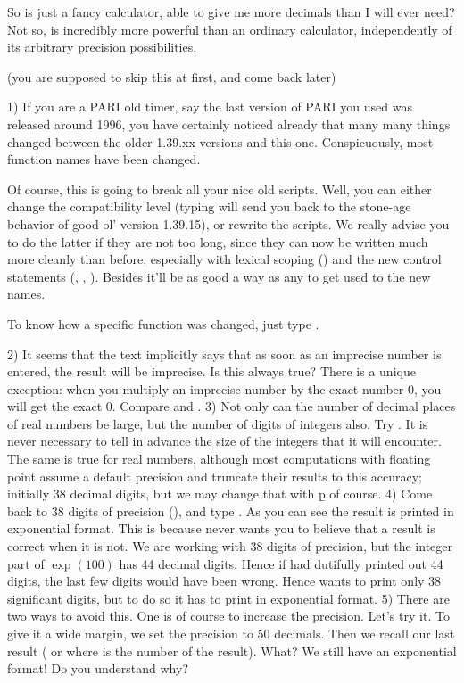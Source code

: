 So  is just a fancy calculator, able to give me more decimals than I
will ever need? Not so,  is incredibly more powerful than an ordinary
calculator, independently of its arbitrary precision possibilities.

 (you are supposed to skip this at first,
and come back later)

1) If you are a PARI old timer, say the last version of PARI you used was
released around 1996, you have certainly noticed already that many many
things changed between the older 1.39.xx versions and this one.
Conspicuously, most function names have been changed.

Of course, this is going to break all your nice old scripts. Well, you can
either change the compatibility level (typing 
will send you back to the stone-age behavior of good ol' version 1.39.15),
or rewrite the scripts. We really advise you to do the latter if they are not
too long, since they can now be written much more cleanly than before,
especially with lexical scoping () and the new control statements
(, , ). Besides it'll be as good a way as any
to get used to the new names.

To know how a specific function was changed, just type .

2) It seems that the text implicitly says that as soon as an imprecise number
is entered, the result will be imprecise. Is this always true? There is a
unique exception: when you multiply an imprecise number by the exact number
0, you will get the exact 0. Compare  and .
\smallskip
%
3) Not only can the number of decimal places of real numbers be large, but
the number of digits of integers also. Try . It is never necessary
to tell  in advance the size of the integers that it will encounter.
The same is true for real numbers, although most computations with floating
point assume a default precision and truncate their results to this accuracy;
initially 38 decimal digits, but we may change that with \b{p} of course.
\smallskip
%
4) Come back to 38 digits of precision (), and type
. As you can see the result is printed in exponential format.
This is because  never wants you to believe that a result is correct
when it is not. We are working with 38 digits of precision, but the integer
part of $\exp(100)$ has 44 decimal digits. Hence if  had dutifully
printed out 44 digits, the last few digits would have been wrong. Hence
 wants to print only 38 significant digits, but to do so it has to
print in exponential format. \smallskip
%
5) There are two ways to avoid this. One is of course to increase the
precision. Let's try it. To give it a wide margin, we set the precision to 50
decimals. Then we recall our last result (\kbd{\%}
or  where  is the number of the result). What? We still have
an exponential format! Do you understand why?


